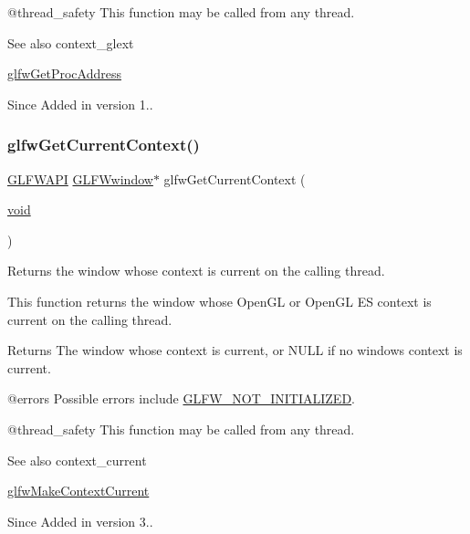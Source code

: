 @thread\+\_\+safety This function may be called from any thread.

\begin{DoxySeeAlso}{See also}
context\+\_\+glext 

\mbox{\hyperlink{group__context_ga0e8af175218929615c16e74938c10f2a}{glfw\+Get\+Proc\+Address}}
\end{DoxySeeAlso}
\begin{DoxySince}{Since}
Added in version 1.. 
\end{DoxySince}
\mbox{\label{group__context_gac28d98c655377d81a516bf5ef90780c8}} 
\subsubsection{\texorpdfstring{glfwGetCurrentContext()}{glfwGetCurrentContext()}}
{\footnotesize\ttfamily \mbox{\hyperlink{glfw3_8h_a56da5036b2cc259351ae22fd6439bb47}{G\+L\+F\+W\+A\+PI}} \mbox{\hyperlink{group__window_ga3c96d80d363e67d13a41b5d1821f3242}{G\+L\+F\+Wwindow}}$\ast$ glfw\+Get\+Current\+Context (\begin{DoxyParamCaption}\item[{\mbox{\hyperlink{glad_8h_a950fc91edb4504f62f1c577bf4727c29}{void}}}]{ }\end{DoxyParamCaption})}



Returns the window whose context is current on the calling thread. 

This function returns the window whose Open\+GL or Open\+GL ES context is current on the calling thread.

\begin{DoxyReturn}{Returns}
The window whose context is current, or {\ttfamily N\+U\+LL} if no window\textquotesingle{}s context is current.
\end{DoxyReturn}
@errors Possible errors include \mbox{\hyperlink{group__errors_ga2374ee02c177f12e1fa76ff3ed15e14a}{G\+L\+F\+W\+\_\+\+N\+O\+T\+\_\+\+I\+N\+I\+T\+I\+A\+L\+I\+Z\+ED}}.

@thread\+\_\+safety This function may be called from any thread.

\begin{DoxySeeAlso}{See also}
context\+\_\+current 

\mbox{\hyperlink{group__context_gafd76c93e15ec8b0b90506a9936a46185}{glfw\+Make\+Context\+Current}}
\end{DoxySeeAlso}
\begin{DoxySince}{Since}
Added in version 3.. 
\end{DoxySince}
\mbox{\label{group__context_ga0e8af175218929615c16e74938c10f2a}} 
